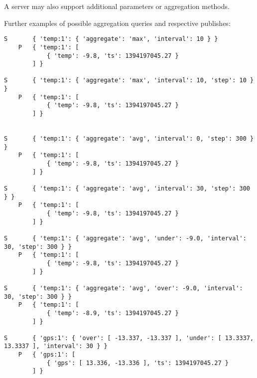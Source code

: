 \documentclass[a4paper]{article}
\begin{document}
A server may also support additional parameters or aggregation methods.


Further examples of possible aggregation queries and respective publishes:
\begin{verbatim}
S       { 'temp:1': { 'aggregate': 'max', 'interval': 10 } }
    P   { 'temp:1': [
            { 'temp': -9.8, 'ts': 1394197045.27 }
        ] }

S       { 'temp:1': { 'aggregate': 'max', 'interval': 10, 'step': 10 } }
    P   { 'temp:1': [
            { 'temp': -9.8, 'ts': 1394197045.27 }
        ] }


S       { 'temp:1': { 'aggregate': 'avg', 'interval': 0, 'step': 300 } }
    P   { 'temp:1': [
            { 'temp': -9.8, 'ts': 1394197045.27 }
        ] }

S       { 'temp:1': { 'aggregate': 'avg', 'interval': 30, 'step': 300 } }
    P   { 'temp:1': [
            { 'temp': -9.8, 'ts': 1394197045.27 }
        ] }

S       { 'temp:1': { 'aggregate': 'avg', 'under': -9.0, 'interval': 30, 'step': 300 } }
    P   { 'temp:1': [
            { 'temp': -9.8, 'ts': 1394197045.27 }
        ] }

S       { 'temp:1': { 'aggregate': 'avg', 'over': -9.0, 'interval': 30, 'step': 300 } }
    P   { 'temp:1': [
            { 'temp': -8.9, 'ts': 1394197045.27 }
        ] }

S       { 'gps:1': { 'over': [ -13.337, -13.337 ], 'under': [ 13.3337, 13.3337 ], 'interval': 30 } }
    P   { 'gps:1': [
            { 'gps': [ 13.336, -13.336 ], 'ts': 1394197045.27 }
        ] }
\end{verbatim}
\end{document}
